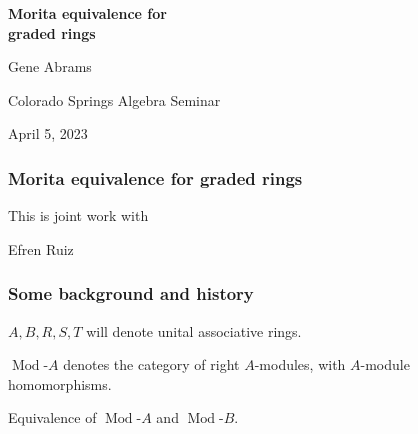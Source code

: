 \documentclass{beamer}
\author[Gene Abrams   \hspace{2.7in}Morita equivalence for graded rings  ]{
}
\institute[UCCS]{
}
\date{
 }
\newcommand{\rmod}[1]{\operatorname{Mod}\text{-}#1}
\begin{document}





\begin{frame}

\begin{center}

\Huge

{\bf Morita equivalence for  \Huge    \\  

graded rings}


\large

\bigskip

\bigskip


Gene Abrams  

\bigskip


\bigskip

Colorado Springs Algebra Seminar

\bigskip

April 5, 2023  
\end{center}


\end{frame}


\begin{frame}
\frametitle{Morita equivalence for graded rings}


\begin{center}
This is joint work with 

\bigskip

\Large
Efren Ruiz
\normalsize
\bigskip


\end{center}

\end{frame}


\begin{frame}
\frametitle{Some background and history}

$A,B,R,S,T$ will denote unital associative rings.

\medskip

$\rmod{A}$  denotes the category of right $A$-modules, with $A$-module homomorphisms.   

\bigskip
\bigskip
\pause



 Equivalence of $\rmod{A}$ and $\rmod{B}$.   
 
  
 \end{frame}
\end{document}
